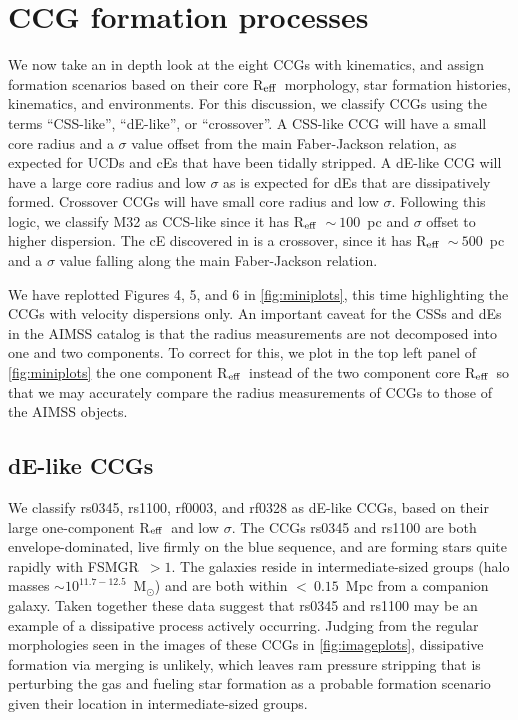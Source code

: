 \documentclass[iop,apj]{emulateapj}
\newcommand{\Reff}{R$_{\rm eff}$}
\newcommand{\Msun}{M$_{\odot}$}
\begin{document}
\section{CCG formation processes} %
\label{discussion}

We now take an in depth look at the eight CCGs with kinematics, and assign formation scenarios based on their core \Reff\, morphology, star formation histories, kinematics, and environments. For this discussion, we classify CCGs using the terms ``CSS-like'', ``dE-like'', or ``crossover''.  A CSS-like CCG will have a small core radius and a $\sigma$ value offset from the main Faber-Jackson relation, as expected for UCDs and cEs that have been tidally stripped. A dE-like CCG will have a large core radius and low $\sigma$ as is expected for dEs that are dissipatively formed. Crossover CCGs will have small core radius and low $\sigma$. Following this logic, we classify M32 as CCS-like since it has \Reff~$\sim~100$~pc and $\sigma$ offset to higher dispersion. The cE discovered in \citet{Huxor2013} is a crossover, since it has \Reff~$\sim~500$~pc and a $\sigma$ value falling along the main Faber-Jackson relation.

We have replotted Figures 4, 5, and 6 in \autoref{fig:miniplots}, this time highlighting the CCGs with velocity dispersions only. An important caveat for the CSSs and dEs in the AIMSS catalog is that the radius measurements are not decomposed into one and two components. To correct for this, we plot in the top left panel of \autoref{fig:miniplots} the one component \Reff\ instead of the two component core \Reff\ so that we may accurately compare the radius measurements of CCGs to those of the AIMSS objects.

\subsection{dE-like CCGs}
We classify rs0345, rs1100, rf0003, and rf0328 as dE-like CCGs, based on their large one-component \Reff\ and low $\sigma$. The CCGs rs0345 and rs1100 are both envelope-dominated, live firmly on the blue sequence, and are forming stars quite rapidly with FSMGR~$>1$. The galaxies reside in intermediate-sized groups (halo masses $\sim10^{11.7-12.5}$~\Msun) and are both within $<~0.15$~Mpc from a companion galaxy. Taken together these data suggest that rs0345 and rs1100 may be an example of a dissipative process actively occurring. Judging from the regular morphologies seen in the images of these CCGs in \autoref{fig:imageplots}, dissipative formation via merging is unlikely, which leaves ram pressure stripping that is perturbing the gas and fueling star formation as a probable formation scenario given their location in intermediate-sized groups.
\end{document}
